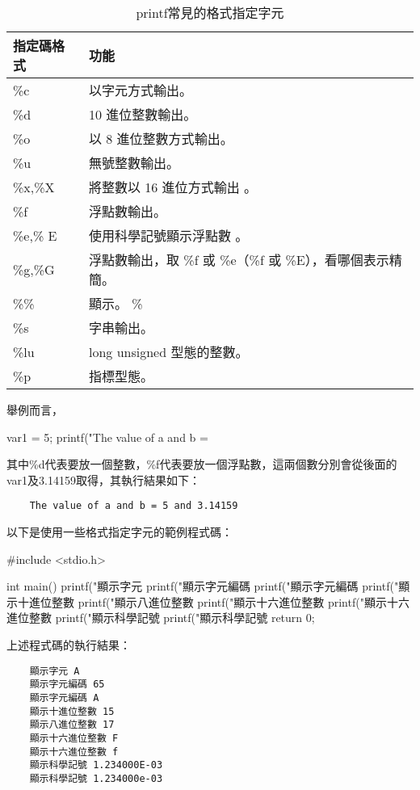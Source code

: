\begin{table}[h]
\centering
\caption{printf常見的格式指定字元}
\begin{tabular}{|l|l|}
	\hline
	\rowcolor{dhscodebg}
	指定碼格式 & 功能\\
	\hline
	\%c& 以字元方式輸出。 \\
	\hline
	\%d&  	10 進位整數輸出。\\
	\hline
	\%o& 	以 8 進位整數方式輸出。\\
	\hline
	\%u&  	無號整數輸出。\\
	\hline
	\%x,\%X &	將整數以 16 進位方式輸出 。\\
	\hline
	\%f&  浮點數輸出。\\
	\hline
	\%e,\% E& 	使用科學記號顯示浮點數 。\\
	\hline
	\%g,\%G &浮點數輸出，取 \%f 或 \%e（\%f 或 \%E），看哪個表示精簡。\\
	\hline
	\%\% &顯示。 \%\\
	\hline
	\%s & 	字串輸出。 \\
	\hline
	\%lu &long unsigned 型態的整數。\\
	\hline
	\%p &指標型態。\\
	\hline
\end{tabular}
\label{specifier}
\end{table}

舉例而言，
\begin{inside}
	var1 = 5;
	printf("The value of a and b = %
\end{inside}
其中\%d代表要放一個整數，\%f代表要放一個浮點數，這兩個數分別會從後面的var1及3.14159取得，其執行結果如下：
\begin{Verbatim}
    The value of a and b = 5 and 3.14159
\end{Verbatim}

以下是使用一些格式指定字元的範例程式碼：
\begin{cppcode}
#include <stdio.h>

int main() 
{
	printf("顯示字元 %
	printf("顯示字元編碼 %
	printf("顯示字元編碼 %
	printf("顯示十進位整數 %
	printf("顯示八進位整數 %
	printf("顯示十六進位整數 %
	printf("顯示十六進位整數 %
	printf("顯示科學記號 %
	printf("顯示科學記號 %
	return 0;
}
\end{cppcode}
上述程式碼的執行結果：
\begin{Verbatim}
    顯示字元 A
    顯示字元編碼 65
    顯示字元編碼 A
    顯示十進位整數 15
    顯示八進位整數 17
    顯示十六進位整數 F
    顯示十六進位整數 f
    顯示科學記號 1.234000E-03
    顯示科學記號 1.234000e-03
\end{Verbatim}

